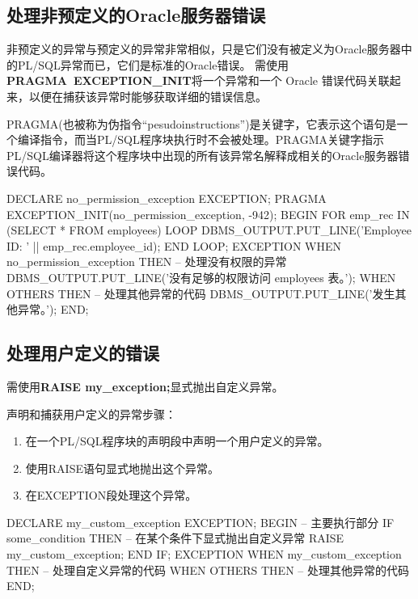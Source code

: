 \documentclass[11pt, a4paper, oneside, UTF8]{ctexbook}
\let\kaishu\relax %
\begin{document}
\subsection{处理非预定义的Oracle服务器错误}

非预定义的异常与预定义的异常非常相似，只是它们没有被定义为Oracle服务器中的PL/SQL异常而已，它们是标准的Oracle错误。
需使用{\bfseries\kaishu PRAGMA\ EXCEPTION\_INIT}将一个异常和一个 Oracle 错误代码关联起来，以便在捕获该异常时能够获取详细的错误信息。

PRAGMA(也被称为伪指令“pesudoinstructions”)是关键字，它表示这个语句是一个编译指令，而当PL/SQL程序块执行时不会被处理。PRAGMA关键字指示PL/SQL编译器将这个程序块中出现的所有该异常名解释成相关的Oracle服务器错误代码。

\begin{plsql}[caption=处理非预定义的Oracle服务器错误示例]
DECLARE
  no_permission_exception EXCEPTION;
  PRAGMA EXCEPTION_INIT(no_permission_exception, -942); 
BEGIN
  FOR emp_rec IN (SELECT * FROM employees) LOOP
    DBMS_OUTPUT.PUT_LINE('Employee ID: ' || emp_rec.employee_id);
  END LOOP;
EXCEPTION
  WHEN no_permission_exception THEN -- 处理没有权限的异常
    DBMS_OUTPUT.PUT_LINE('没有足够的权限访问 employees 表。');
  WHEN OTHERS THEN -- 处理其他异常的代码
  DBMS_OUTPUT.PUT_LINE('发生其他异常。');
END;
\end{plsql}

\subsection{处理用户定义的错误}
需使用{\bfseries\kaishu RAISE my\_exception;}显式抛出自定义异常。

声明和捕获用户定义的异常步骤：
\begin{enumerate}
  \item 在一个PL/SQL程序块的声明段中声明一个用户定义的异常。
  \item 使用RAISE语句显式地抛出这个异常。
  \item 在EXCEPTION段处理这个异常。
\end{enumerate}

\begin{plsql}[caption=处理用户定义的错误示例1]
DECLARE
  my_custom_exception EXCEPTION;
BEGIN
  -- 主要执行部分
  IF some_condition THEN -- 在某个条件下显式抛出自定义异常
    RAISE my_custom_exception;
  END IF;
EXCEPTION
  WHEN my_custom_exception THEN -- 处理自定义异常的代码
  WHEN OTHERS THEN -- 处理其他异常的代码
END;
\end{plsql}
\end{document}
